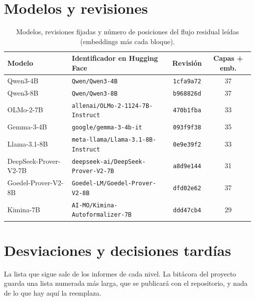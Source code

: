 \documentclass[10pt]{article}
\newcommand{\vr}[1]{\texttt{#1}}
\begin{document}



\appendix
\section{Modelos y revisiones}\label{app:modelos}
\begin{table}[h]
\centering
\caption{Modelos, revisiones fijadas y número de posiciones del flujo residual leídas (embeddings más cada bloque).}
\vspace{2pt}
\begin{tabular}{@{}llcc@{}}
\toprule
Modelo & Identificador en Hugging Face & Revisión & Capas + emb.\\
\midrule
Qwen3-4B              & \vr{Qwen/Qwen3-4B}                         & \vr{1cfa9a72} & 37\\
Qwen3-8B              & \vr{Qwen/Qwen3-8B}                         & \vr{b968826d} & 37\\
OLMo-2-7B             & \vr{allenai/OLMo-2-1124-7B-Instruct}       & \vr{470b1fba} & 33\\
Gemma-3-4B            & \vr{google/gemma-3-4b-it}                  & \vr{093f9f38} & 35\\
Llama-3.1-8B          & \vr{meta-llama/Llama-3.1-8B-Instruct}      & \vr{0e9e39f2} & 33\\
DeepSeek-Prover-V2-7B & \vr{deepseek-ai/DeepSeek-Prover-V2-7B}     & \vr{a8d9e144} & 31\\
Goedel-Prover-V2-8B   & \vr{Goedel-LM/Goedel-Prover-V2-8B}         & \vr{dfd02e62} & 37\\
Kimina-7B             & \vr{AI-MO/Kimina-Autoformalizer-7B}        & \vr{ddd47cb4} & 29\\
\bottomrule
\end{tabular}
\end{table}

\section{Desviaciones y decisiones tardías}\label{app:desviaciones}

La lista que sigue sale de los informes de cada nivel. La bitácora del proyecto guarda una lista numerada más larga,
que se publicará con el repositorio, y nada de lo que hay aquí la reemplaza.
\end{document}
